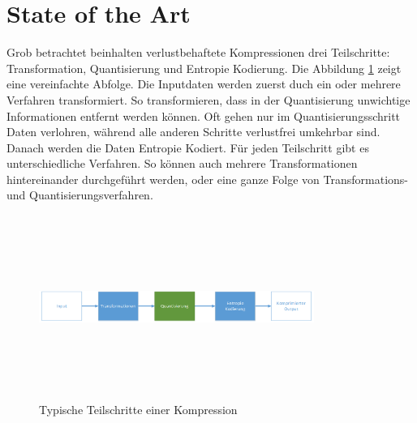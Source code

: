 \section{State of the Art}
Grob betrachtet beinhalten verlustbehaftete Kompressionen drei Teilschritte: Transformation, Quantisierung und Entropie Kodierung. Die Abbildung \ref{state:aufbau} zeigt eine vereinfachte Abfolge. Die Inputdaten werden zuerst duch ein oder mehrere Verfahren transformiert. So transformieren, dass in der Quantisierung unwichtige Informationen entfernt werden können. Oft gehen nur im Quantisierungsschritt Daten verlohren, während alle anderen Schritte verlustfrei umkehrbar sind. Danach werden die Daten Entropie Kodiert. Für jeden Teilschritt gibt es unterschiedliche Verfahren. So können auch mehrere Transformationen hintereinander durchgeführt werden, oder eine ganze Folge von Transformations- und Quantisierungsverfahren.\\
\begin{figure}[!htbp]
	\center
	\includegraphics[width=0.8\textwidth,height=6cm,keepaspectratio]{./pictures/state/aufbau.png}
	\caption{Typische Teilschritte einer Kompression}
	\label{state:aufbau}
\end{figure}

